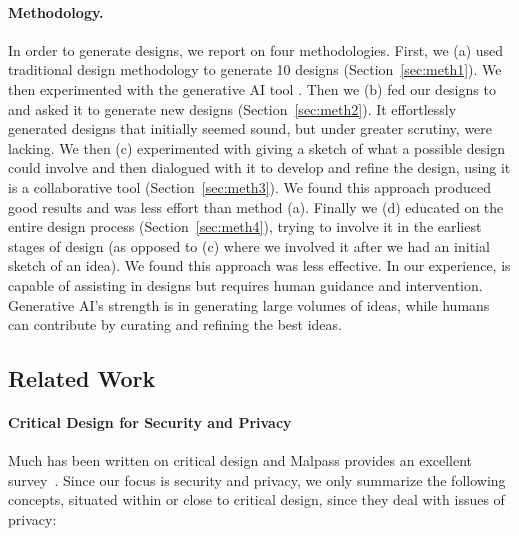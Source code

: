 \paragraph{Methodology.} In order to generate designs, we report on four methodologies. First, we (a) used traditional design methodology to generate 10 designs (Section~\ref{sec:meth1}). We then experimented with the generative AI tool \gpt \gptv. Then we (b) fed our designs to \gpt and asked it to generate new designs (Section~\ref{sec:meth2}). It effortlessly generated designs that initially seemed sound, but under greater scrutiny, were lacking. We then (c) experimented with giving \gpt a sketch of what a possible design could involve and then dialogued with it to develop and refine the design, using it is a collaborative tool (Section~\ref{sec:meth3}). We found this approach produced good results and was less effort than method (a). Finally we (d) educated \gpt on the entire design process (Section~\ref{sec:meth4}), trying to involve it in the earliest stages of design (as opposed to (c) where we involved it after we had an initial sketch of an idea). We found this approach was less effective. In our experience, \gpt is capable of assisting in designs but requires human guidance and intervention. Generative AI's strength is in generating large volumes of ideas, while humans can contribute by curating and refining the best ideas.

\subsection{Related Work}

\paragraph{Critical Design for Security and Privacy}

Much has been written on critical design and Malpass provides an excellent survey~\cite{Mal17}. Since our focus is security and privacy, we only summarize the following concepts, situated within or close to critical design, since they deal with issues of privacy: 

